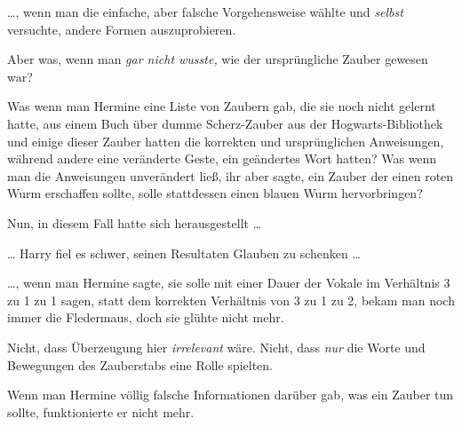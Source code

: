…, wenn man die einfache, aber falsche Vorgehensweise wählte und \emph{selbst} versuchte, andere Formen auszuprobieren.

Aber was, wenn man \emph{gar nicht wusste,} wie der ursprüngliche Zauber gewesen war?

Was wenn man Hermine eine Liste von Zaubern gab, die sie noch nicht gelernt hatte, aus einem Buch über dumme Scherz-Zauber aus der Hogwarts-Bibliothek und einige dieser Zauber hatten die korrekten und ursprünglichen Anweisungen, während andere eine veränderte Geste, ein geändertes Wort hatten? Was wenn man die Anweisungen unverändert ließ, ihr aber sagte, ein Zauber der einen roten Wurm erschaffen sollte, solle stattdessen einen blauen Wurm hervorbringen?

Nun, in diesem Fall hatte sich herausgestellt …

… Harry fiel es schwer, seinen Resultaten Glauben zu schenken …

…, wenn man Hermine sagte, sie solle  mit einer Dauer der Vokale im Verhältnis 3 zu 1 zu 1 sagen, statt dem korrekten Verhältnis von 3 zu 1 zu 2, bekam man noch immer die Fledermaus, doch sie glühte nicht mehr.

Nicht, dass Überzeugung hier \emph{irrelevant} wäre. Nicht, dass \emph{nur} die Worte und Bewegungen des Zauberstabs eine Rolle spielten.

Wenn man Hermine völlig falsche Informationen darüber gab, was ein Zauber tun sollte, funktionierte er nicht mehr.

